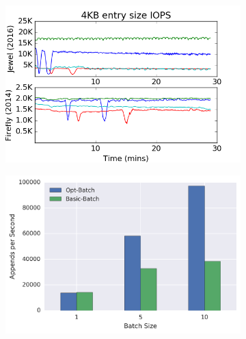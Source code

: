 \begin{figure}[t]
    \centering
    \begin{subfigure}[b]{.33\linewidth}
        \centering
        \includegraphics[width=1.0\linewidth]{jewel_v_firefly_pd.png}
        \caption{}
        \label{fig:phy-design}
    \end{subfigure}
    \begin{subfigure}[b]{.33\linewidth}
        \centering
        \includegraphics[width=1.0\linewidth]{batching.png}
        \caption{}
        \label{fig:batching}
    \end{subfigure}
    \begin{subfigure}[b]{.33\linewidth}
        \centering

\end{subfigure}
\end{figure}
